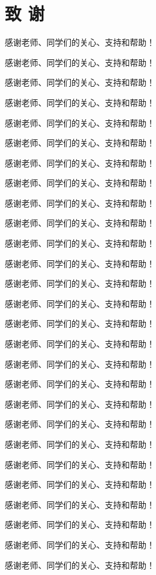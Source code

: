 \chapter{致 \quad 谢}
\thispagestyle{others}
\pagestyle{others}

感谢老师、同学们的关心、支持和帮助！

感谢老师、同学们的关心、支持和帮助！

感谢老师、同学们的关心、支持和帮助！

感谢老师、同学们的关心、支持和帮助！

感谢老师、同学们的关心、支持和帮助！

感谢老师、同学们的关心、支持和帮助！

感谢老师、同学们的关心、支持和帮助！

感谢老师、同学们的关心、支持和帮助！

感谢老师、同学们的关心、支持和帮助！

感谢老师、同学们的关心、支持和帮助！

感谢老师、同学们的关心、支持和帮助！

感谢老师、同学们的关心、支持和帮助！

感谢老师、同学们的关心、支持和帮助！

感谢老师、同学们的关心、支持和帮助！

感谢老师、同学们的关心、支持和帮助！

感谢老师、同学们的关心、支持和帮助！

感谢老师、同学们的关心、支持和帮助！

感谢老师、同学们的关心、支持和帮助！

感谢老师、同学们的关心、支持和帮助！

感谢老师、同学们的关心、支持和帮助！

感谢老师、同学们的关心、支持和帮助！

感谢老师、同学们的关心、支持和帮助！

感谢老师、同学们的关心、支持和帮助！

感谢老师、同学们的关心、支持和帮助！

感谢老师、同学们的关心、支持和帮助！

感谢老师、同学们的关心、支持和帮助！

感谢老师、同学们的关心、支持和帮助！


